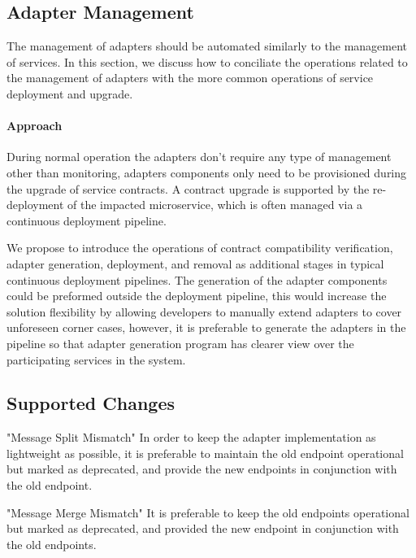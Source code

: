 \subsection{Adapter Management} %
\label{sec:adapter_management}

The management of adapters should be automated similarly to the management of services.
In this section, we discuss how to conciliate the operations related to the management of adapters with the more common operations of service deployment and upgrade.

\paragraph{Approach}
During normal operation the adapters don't require any type of management other than monitoring,
adapters components only need to be provisioned during the upgrade of service contracts.
A contract upgrade is supported by the re-deployment of the impacted microservice, which is often managed via a continuous deployment pipeline.

We propose to introduce the operations of contract compatibility verification, adapter generation, deployment,
and removal as additional stages in typical continuous deployment pipelines.
The generation of the adapter components could be preformed outside the deployment pipeline,
this would increase the solution flexibility by allowing developers to manually extend adapters to cover unforeseen corner cases,
however, it is preferable to generate the adapters in the pipeline so that adapter generation program has clearer view
over the participating services in the system.

\subsection{Supported Changes} %
\label{sec:supported_changes}

"Message Split Mismatch"
In order to keep the adapter implementation as lightweight as possible, it is preferable to maintain the old endpoint operational but marked as deprecated, and provide the new endpoints in conjunction with the old endpoint.

"Message Merge Mismatch"
It is preferable to keep the old endpoints operational but marked as deprecated, and provided the new endpoint in conjunction with the old endpoints.

